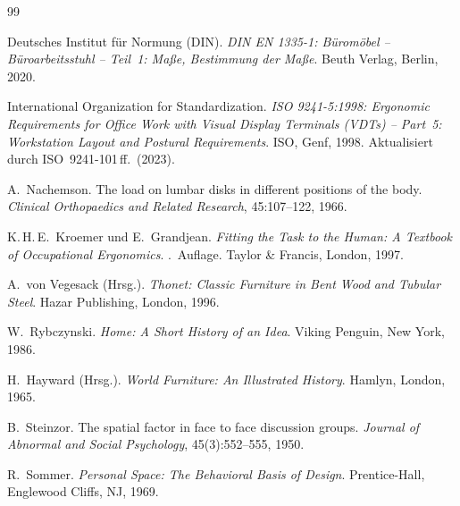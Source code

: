 ﻿\documentclass[a4paper,12pt]{article}
\theoremstyle{definition}
\begin{document}
\begin{thebibliography}{99}


Deutsches Institut f\"{u}r Normung (DIN).
\newblock \emph{DIN EN 1335-1: B\"{u}rom\"{o}bel -- B\"{u}roarbeitsstuhl --
  Teil~1: Ma\ss{}e, Bestimmung der Ma\ss{}e}.
\newblock Beuth Verlag, Berlin, 2020.

International Organization for Standardization.
\newblock \emph{ISO 9241-5:1998: Ergonomic Requirements for Office Work with
  Visual Display Terminals (VDTs) -- Part~5: Workstation Layout and Postural
  Requirements}.
\newblock ISO, Genf, 1998.
\newblock Aktualisiert durch ISO~9241-101\,ff.\ (2023).


A.~Nachemson.
\newblock The load on lumbar disks in different positions of the body.
\newblock \emph{Clinical Orthopaedics and Related Research}, 45:107--122,
  1966.

K.\,H.\,E.~Kroemer und E.~Grandjean.
\newblock \emph{Fitting the Task to the Human: A Textbook of Occupational
  Ergonomics}.
.\ Auflage. Taylor \& Francis, London, 1997.


A.~von Vegesack (Hrsg.).
\newblock \emph{Thonet: Classic Furniture in Bent Wood and Tubular Steel}.
\newblock Hazar Publishing, London, 1996.

W.~Rybczynski.
\newblock \emph{Home: A Short History of an Idea}.
\newblock Viking Penguin, New York, 1986.

H.~Hayward (Hrsg.).
\newblock \emph{World Furniture: An Illustrated History}.
\newblock Hamlyn, London, 1965.


B.~Steinzor.
\newblock The spatial factor in face to face discussion groups.
\newblock \emph{Journal of Abnormal and Social Psychology},
  45(3):552--555, 1950.

R.~Sommer.
\newblock \emph{Personal Space: The Behavioral Basis of Design}.
\newblock Prentice-Hall, Englewood Cliffs, NJ, 1969.



\end{thebibliography}
\end{document}
